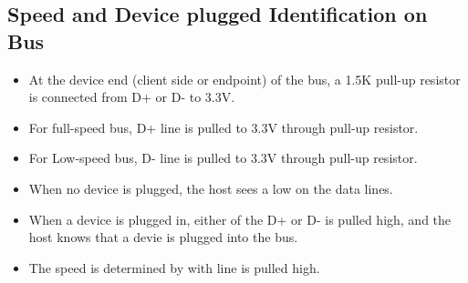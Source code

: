 \documentclass{article}
\begin{document}
\subsection{Speed and Device plugged Identification on Bus}
\label{sec: deviIden}
\begin{itemize}
    \item At the device end (client side or endpoint) of the bus, a 1.5K pull-up resistor is connected from D+ or D- to 3.3V.
    \item For full-speed bus, D+ line is pulled to 3.3V through pull-up resistor.
    \item For Low-speed bus, D- line is pulled to 3.3V through pull-up resistor.
    \item When no device is plugged, the host sees a low on the data lines.
    \item When a device is plugged in, either of the D+ or D- is pulled high, and the host knows that a devie is plugged into the bus.
    \item The speed is determined by with line is pulled high.
\end{itemize}
\end{document}
